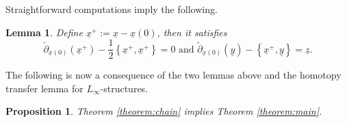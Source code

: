 \documentclass[a4paper]{article}
\newtheorem{lemma}[theorem]{Lemma}
\newtheorem{proposition}[theorem]{Proposition}
\numberwithin{equation}{section}
\begin{document}
Straightforward computations imply the following.

\begin{lemma}\label{lemma:+}
Define $\underline{x}^+:=\underline{x}-\underline{x}(0)$, then it satisfies
\begin{equation}
\tilde{\partial}_{\underline{x}(0)}(\underline{x}^+)-\frac{1}{2}\left\{\underline{x}^+,\underline{x}^+\right\}=0\textrm{ and } \tilde{\partial}_{\underline{x}(0)}(\underline{y})-\left\{\underline{x}^+,\underline{y}\right\}=\underline{z}.
\end{equation}
\end{lemma}

The following is now a consequence of the two lemmas above and the homotopy transfer lemma for $L_\infty$-structures.

\begin{proposition}
Theorem \ref{theorem:chain} implies Theorem \ref{theorem:main}.
\end{proposition}
\end{document}
